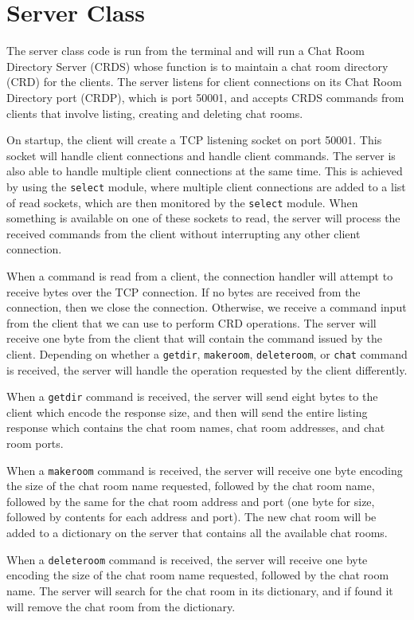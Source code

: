 \section*{Server Class}
The server class code is run from the terminal and will run a Chat Room Directory Server (CRDS) whose function is to maintain a chat room directory (CRD) for the clients. The server listens for client connections on its Chat Room Directory port (CRDP), which is port 50001, and accepts CRDS commands from clients that involve listing, creating and deleting chat rooms.

On startup, the client will create a TCP listening socket on port 50001. This socket will handle client connections and handle client commands. The server is also able to handle multiple client connections at the same time. This is achieved by using the \texttt{select} module, where multiple client connections are added to a list of read sockets, which are then monitored by the \texttt{select} module. When something is available on one of these sockets to read, the server will process the received commands from the client without interrupting any other client connection.

When a command is read from a client, the connection handler will attempt to receive bytes over the TCP connection. If no bytes are received from the connection, then we close the connection. Otherwise, we receive a command input from the client that we can use to perform CRD operations. The server will receive one byte from the client that will contain the command issued by the client. Depending on whether a \texttt{getdir}, \texttt{makeroom}, \texttt{deleteroom}, or \texttt{chat} command is received, the server will handle the operation requested by the client differently.

When a \texttt{getdir} command is received, the server will send eight bytes to the client which encode the response size, and then will send the entire listing response which contains the chat room names, chat room addresses, and chat room ports.

When a \texttt{makeroom} command is received, the server will receive one byte encoding the size of the chat room name requested, followed by the chat room name, followed by the same for the chat room address and port (one byte for size, followed by contents for each address and port). The new chat room will be added to a dictionary on the server that contains all the available chat rooms.

When a \texttt{deleteroom} command is received, the server will receive one byte encoding the size of the chat room name requested, followed by the chat room name. The server will search for the chat room in its dictionary, and if found it will remove the chat room from the dictionary.

